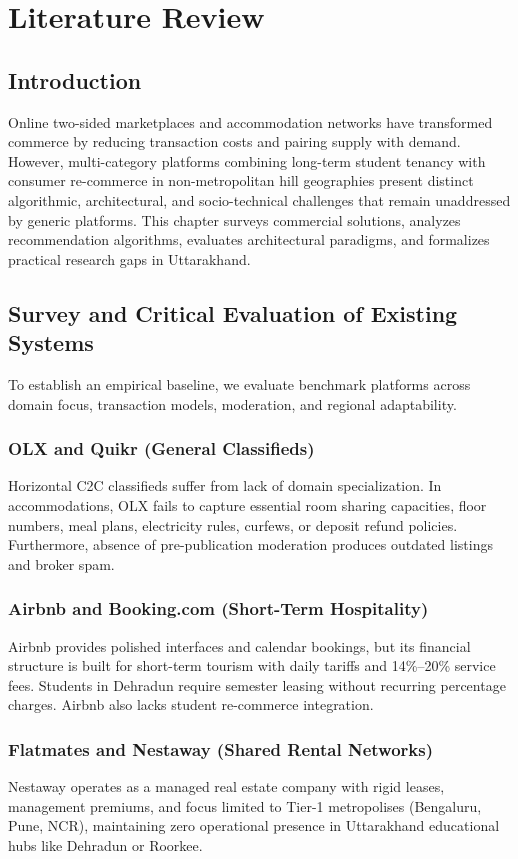 \chapter{Literature Review}

\section{Introduction}
Online two-sided marketplaces and accommodation networks have transformed commerce by reducing transaction costs and pairing supply with demand. However, multi-category platforms combining long-term student tenancy with consumer re-commerce in non-metropolitan hill geographies present distinct algorithmic, architectural, and socio-technical challenges that remain unaddressed by generic platforms. This chapter surveys commercial solutions, analyzes recommendation algorithms, evaluates architectural paradigms, and formalizes practical research gaps in Uttarakhand.

\section{Survey and Critical Evaluation of Existing Systems}
To establish an empirical baseline, we evaluate benchmark platforms across domain focus, transaction models, moderation, and regional adaptability.

\subsection{OLX and Quikr (General Classifieds)}
Horizontal C2C classifieds suffer from lack of domain specialization. In accommodations, OLX fails to capture essential room sharing capacities, floor numbers, meal plans, electricity rules, curfews, or deposit refund policies. Furthermore, absence of pre-publication moderation produces outdated listings and broker spam.

\subsection{Airbnb and Booking.com (Short-Term Hospitality)}
Airbnb provides polished interfaces and calendar bookings, but its financial structure is built for short-term tourism with daily tariffs and 14\%--20\% service fees. Students in Dehradun require semester leasing without recurring percentage charges. Airbnb also lacks student re-commerce integration.

\subsection{Flatmates and Nestaway (Shared Rental Networks)}
Nestaway operates as a managed real estate company with rigid leases, management premiums, and focus limited to Tier-1 metropolises (Bengaluru, Pune, NCR), maintaining zero operational presence in Uttarakhand educational hubs like Dehradun or Roorkee.

